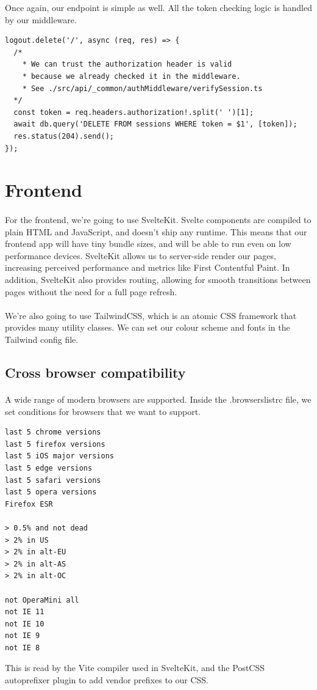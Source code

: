 \documentclass{report}
\begin{document}
Once again, our endpoint is simple as well. All the token checking logic is handled by our middleware.

\begin{verbatim}
logout.delete('/', async (req, res) => {
  /*
    * We can trust the authorization header is valid
    * because we already checked it in the middleware.
    * See ./src/api/_common/authMiddleware/verifySession.ts
  */
  const token = req.headers.authorization!.split(' ')[1];
  await db.query('DELETE FROM sessions WHERE token = $1', [token]);
  res.status(204).send();
});
\end{verbatim}

\section{Frontend}
\paragraph{}
For the frontend, we're going to use SvelteKit. Svelte components are compiled to plain HTML and JavaScript, and doesn't ship any runtime. This means that our frontend app will have tiny bundle sizes, and will be able to run even on low performance devices. SvelteKit allows us to server-side render our pages, increasing perceived performance and metrics like First Contentful Paint. In addition, SvelteKit also provides routing, allowing for smooth transitions between pages without the need for a full page refresh.

\paragraph{}
We're also going to use TailwindCSS, which is an atomic CSS framework that provides many utility classes. We can set our colour scheme and fonts in the Tailwind config file.

\subsection{Cross browser compatibility}
\paragraph{}
A wide range of modern browsers are supported. Inside the .browserslistrc file, we set conditions for browsers that we want to support.

\begin{verbatim}
last 5 chrome versions
last 5 firefox versions
last 5 iOS major versions
last 5 edge versions
last 5 safari versions
last 5 opera versions
Firefox ESR

> 0.5% and not dead
> 2% in US
> 2% in alt-EU
> 2% in alt-AS
> 2% in alt-OC

not OperaMini all
not IE 11
not IE 10
not IE 9
not IE 8
\end{verbatim}
This is read by the Vite compiler used in SvelteKit, and the PostCSS autoprefixer plugin to add vendor prefixes to our CSS.
\end{document}
